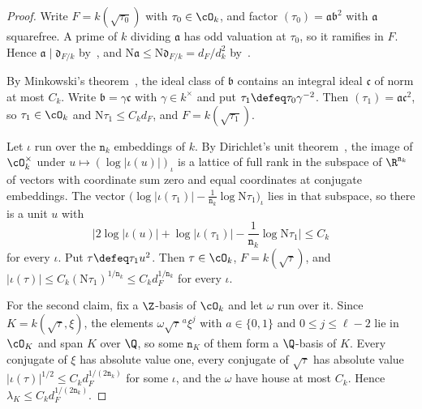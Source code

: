 \documentclass[11pt, reqno, twoside, letterpaper]{amsart}
\newcommand{\Nm}{\mathrm{N}}
\newcommand{\fa}{\mathfrak{a}}
\newcommand{\fb}{\mathfrak{b}}
\newcommand{\fc}{\mathfrak{c}}
\newcommand{\fd}{\mathfrak{d}}
\newcommand{\dk}{{\mathtt{n}_k}}
\newcommand{\dK}{{\mathtt{n}_K}}
\newcommand{\auxp}{\ell}
\newcommand{\rou}{\xi}
\newcommand{\lamK}{\lambda_{\Kf}}
\newcommand{\Kf}{K}
\begin{document}
\begin{proof}
Write $F=k(\sqrt{\tau_0})$ with $\tau_0\in\cO_k$, and factor
$(\tau_0)=\fa\fb^2$ with $\fa$ squarefree. A prime of $k$ dividing
$\fa$ has odd valuation at $\tau_0$, so it ramifies in $F$. Hence
$\fa\mid\fd_{F/k}$ by~\cite[Chapter~III, Corollary~(2.12)]{Ne}, and
$\Nm\fa\le\Nm\fd_{F/k}=d_F/d_k^{2}$
by~\cite[Chapter~III, Corollary~(2.10)]{Ne}.

By Minkowski's theorem~\cite[Chapter~I, Theorem~(6.3)]{Ne}, the ideal
class of $\fb$ contains an integral ideal $\fc$ of norm at most $C_k$.
Write $\fb=\gamma\fc$ with $\gamma\in k^\times$ and put
$\tau_1\defeq\tau_0\gamma^{-2}$. Then $(\tau_1)=\fa\fc^2$, so
$\tau_1\in\cO_k$ and $\Nm\tau_1\le C_kd_F$, and $F=k(\sqrt{\tau_1})$.

Let $\iota$ run over the $\dk$ embeddings of $k$. By Dirichlet's unit
theorem~\cite[Chapter~I, Theorems~(7.3) and~(7.4)]{Ne}, the image of
$\cO_k^\times$ under $u\mapsto(\log|\iota(u)|)_\iota$ is a lattice of
full rank in the subspace of $\R^{\dk}$ of vectors with coordinate
sum zero and equal coordinates at conjugate embeddings. The vector
$\big(\log|\iota(\tau_1)|-\tfrac1{\dk}\log\Nm\tau_1\big)_\iota$ lies
in that subspace, so there is a unit $u$ with
\[
\Big|2\log|\iota(u)|+\log|\iota(\tau_1)|-\frac1{\dk}\log\Nm\tau_1\Big|
\le C_k
\]
for every $\iota$. Put $\tau\defeq\tau_1u^2$. Then $\tau\in\cO_k$,
$F=k(\sqrt\tau)$, and
$|\iota(\tau)|\le C_k(\Nm\tau_1)^{1/\dk}\le C_kd_F^{1/\dk}$ for every
$\iota$.

For the second claim, fix a $\Z$-basis of $\cO_k$ and let $\omega$ run
over it. Since $\Kf=k(\sqrt\tau,\rou)$, the elements
$\omega\sqrt\tau^{\,a}\rou^{j}$ with $a\in\{0,1\}$ and
$0\le j\le\auxp-2$ lie in $\cO_\Kf$ and span $\Kf$ over $\Q$, so some
$\dK$ of them form a $\Q$-basis of $\Kf$. Every conjugate of $\rou$
has absolute value one, every conjugate of $\sqrt\tau$ has absolute
value $|\iota(\tau)|^{1/2}\le C_kd_F^{1/(2\dk)}$ for some $\iota$, and
the $\omega$ have house at most $C_k$. Hence
$\lamK\le C_kd_F^{1/(2\dk)}$.
\end{proof}
\end{document}

